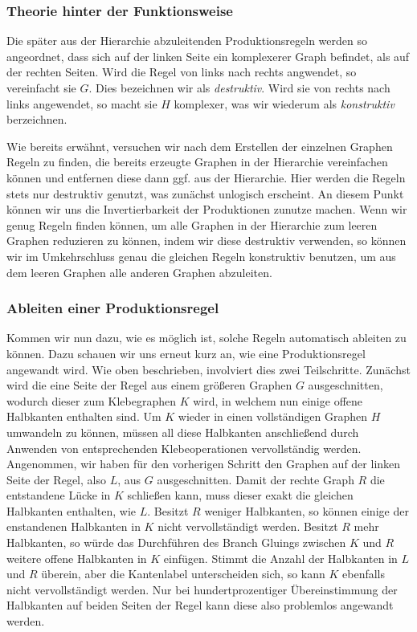 
\subsubsection{Theorie hinter der Funktionsweise}
Die später aus der Hierarchie abzuleitenden Produktionsregeln werden so angeordnet, dass sich auf der linken Seite ein komplexerer Graph befindet,
als auf der rechten Seiten. Wird die Regel von links nach rechts angwendet, so vereinfacht sie \(G\). Dies bezeichnen wir als \textit{destruktiv}.
Wird sie von rechts nach links angewendet, so macht sie \(H\) komplexer, was wir wiederum als \textit{konstruktiv} berzeichnen.

Wie bereits erwähnt, versuchen wir nach dem Erstellen der einzelnen Graphen Regeln zu finden, die bereits erzeugte Graphen in der Hierarchie
vereinfachen können und entfernen diese dann ggf. aus der Hierarchie. Hier werden die Regeln stets nur destruktiv genutzt, was zunächst unlogisch
erscheint. An diesem Punkt können wir uns die Invertierbarkeit der Produktionen zunutze machen. Wenn wir genug Regeln finden können, um alle Graphen
in der Hierarchie zum leeren Graphen reduzieren zu können, indem wir diese destruktiv verwenden, so können wir im Umkehrschluss genau die gleichen
Regeln konstruktiv benutzen, um aus dem leeren Graphen alle anderen Graphen abzuleiten.

\subsubsection{Ableiten einer Produktionsregel}
Kommen wir nun dazu, wie es möglich ist, solche Regeln automatisch ableiten zu können. Dazu schauen wir uns erneut kurz an, wie eine Produktionsregel
angewandt wird. Wie oben beschrieben, involviert dies zwei Teilschritte. Zunächst wird die eine Seite der Regel aus einem größeren Graphen \(G\)
ausgeschnitten, wodurch dieser zum Klebegraphen \(K\) wird, in welchem nun einige offene Halbkanten enthalten sind. Um \(K\) wieder in einen vollständigen
Graphen \(H\) umwandeln zu können,
müssen all diese Halbkanten anschließend durch Anwenden von entsprechenden Klebeoperationen vervollständig werden. Angenommen, wir haben für den
vorherigen Schritt den Graphen auf der linken Seite der Regel, also \(L\), aus \(G\) ausgeschnitten. Damit der rechte Graph \(R\) die entstandene
Lücke in \(K\) schließen kann, muss dieser exakt die gleichen Halbkanten enthalten, wie \(L\). Besitzt \(R\) weniger Halbkanten, so können einige
der enstandenen Halbkanten in \(K\) nicht vervollständigt werden. Besitzt \(R\) mehr Halbkanten, so würde das Durchführen des Branch Gluings zwischen
\(K\) und \(R\) weitere offene Halbkanten in \(K\) einfügen. Stimmt die Anzahl der Halbkanten in \(L\) und \(R\) überein, aber die Kantenlabel
unterscheiden sich, so kann \(K\) ebenfalls nicht vervollständigt werden. Nur bei hundertprozentiger Übereinstimmung der Halbkanten auf beiden Seiten
der Regel kann diese also problemlos angewandt werden.

